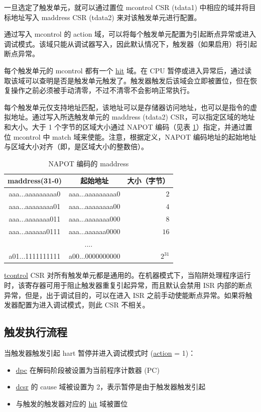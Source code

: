 \documentclass[main\_\_CN.tex]{subfiles}
\begin{document}
一旦选定了触发单元，就可以通过置位 mcontrol CSR (tdata1) 中相应的域并将目标地址写入 maddress CSR (tdata2) 来对该触发单元进行配置。

通过写入 mcontrol 的 action 域，可以将每个触发单元配置为引起断点异常或进入调试模式。该域只能从调试器写入，因此默认情况下，触发器（如果启用）将引起断点异常。

每个触发单元的 mcontrol 都有一个 \hyperref[fielddesc:MCONTROLHIT]{hit} 域。在 CPU 暂停或进入异常后，通过读取该域可以查明是否是触发单元触发了。触发器触发后该域会立即被置位，但在恢复操作之前必须被手动清零，不过不清零不会影响正常执行。

每个触发单元仅支持地址匹配，该地址可以是存储器访问地址，也可以是指令的虚拟地址。通过写入所选触发单元的 maddress (tdata2) CSR，可以指定区域的地址和大小。大于 1 个字节的区域大小通过 NAPOT 编码（见表 \ref{tab:riscvcpu-hwt-table}）指定，并通过置位 mcontrol 中 match 域来使能。注意，根据定义，NAPOT 编码地址的起始地址与区域大小对齐（即，是区域大小的整数倍）。

\begin{longtable}{ | c | c | r | }
\caption{NAPOT 编码的 maddress} \label{tab:riscvcpu-hwt-table}
\\ \hline
\rowcolor{lightgray}
maddress(31-0) & 起始地址 & 大小（字节） \\ \hline
aaa...aaaaaaaaa0 & aaa...aaaaaaaaa0 & $2$ \\ \hline
aaa...aaaaaaaa01 & aaa...aaaaaaaa00 & $4$ \\ \hline
aaa...aaaaaaa011 & aaa...aaaaaaa000 & $8$ \\ \hline
aaa...aaaaaa0111 & aaa...aaaaaa0000 & $16$ \\ \hline
\multicolumn{3}{c}{....} \\ \hline
a01...1111111111 & a00...0000000000 & $2^{31}$ \\ \hline
\end{longtable}

\hyperref[regdesc:TCONTROL]{tcontrol} CSR 对所有触发单元都是通用的。在机器模式下，当陷阱处理程序运行时，该寄存器可用于阻止触发器重复引起异常，而且默认会禁用 ISR 内部的断点异常，但是，出于调试目的，可以在进入 ISR 之前手动使能断点异常。如果将触发器配置为进入调试模式，则此 CSR 不相关。

\subsection{触发执行流程}
\label{sec:riscvcpu-hwt-suggest-op}

当触发器触发引起 hart 暂停并进入调试模式时 (\hyperref[fielddesc:MCONTROLACTION]{action} = 1)：
\begin{itemize}
    \item \hyperref[regdesc:DPC]{dpc} 在解码阶段被设置为当前程序计数器 (PC)
    \item \hyperref[regdesc:DCSR]{dcsr} 的 cause 域被设置为 2，表示暂停是由于触发器触发引起
    \item 与触发的触发器对应的 \hyperref[fielddesc:MCONTROLHIT]{hit} 域被置位
\end{itemize}
\end{document}
